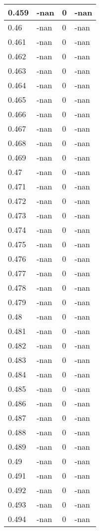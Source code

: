 \documentclass[a4paper,14pt]{extarticle}
\begin{document}
\begin{longtable}{||m{3cm}||m{3cm}|m{3cm}||m{3cm}||}
\hline
0.459 & -nan & 0 & -nan\\
\hline
0.46 & -nan & 0 & -nan\\
\hline
0.461 & -nan & 0 & -nan\\
\hline
0.462 & -nan & 0 & -nan\\
\hline
0.463 & -nan & 0 & -nan\\
\hline
0.464 & -nan & 0 & -nan\\
\hline
0.465 & -nan & 0 & -nan\\
\hline
0.466 & -nan & 0 & -nan\\
\hline
0.467 & -nan & 0 & -nan\\
\hline
0.468 & -nan & 0 & -nan\\
\hline
0.469 & -nan & 0 & -nan\\
\hline
0.47 & -nan & 0 & -nan\\
\hline
0.471 & -nan & 0 & -nan\\
\hline
0.472 & -nan & 0 & -nan\\
\hline
0.473 & -nan & 0 & -nan\\
\hline
0.474 & -nan & 0 & -nan\\
\hline
0.475 & -nan & 0 & -nan\\
\hline
0.476 & -nan & 0 & -nan\\
\hline
0.477 & -nan & 0 & -nan\\
\hline
0.478 & -nan & 0 & -nan\\
\hline
0.479 & -nan & 0 & -nan\\
\hline
0.48 & -nan & 0 & -nan\\
\hline
0.481 & -nan & 0 & -nan\\
\hline
0.482 & -nan & 0 & -nan\\
\hline
0.483 & -nan & 0 & -nan\\
\hline
0.484 & -nan & 0 & -nan\\
\hline
0.485 & -nan & 0 & -nan\\
\hline
0.486 & -nan & 0 & -nan\\
\hline
0.487 & -nan & 0 & -nan\\
\hline
0.488 & -nan & 0 & -nan\\
\hline
0.489 & -nan & 0 & -nan\\
\hline
0.49 & -nan & 0 & -nan\\
\hline
0.491 & -nan & 0 & -nan\\
\hline
0.492 & -nan & 0 & -nan\\
\hline
0.493 & -nan & 0 & -nan\\
\hline
0.494 & -nan & 0 & -nan\\

\end{longtable}
\end{document}
